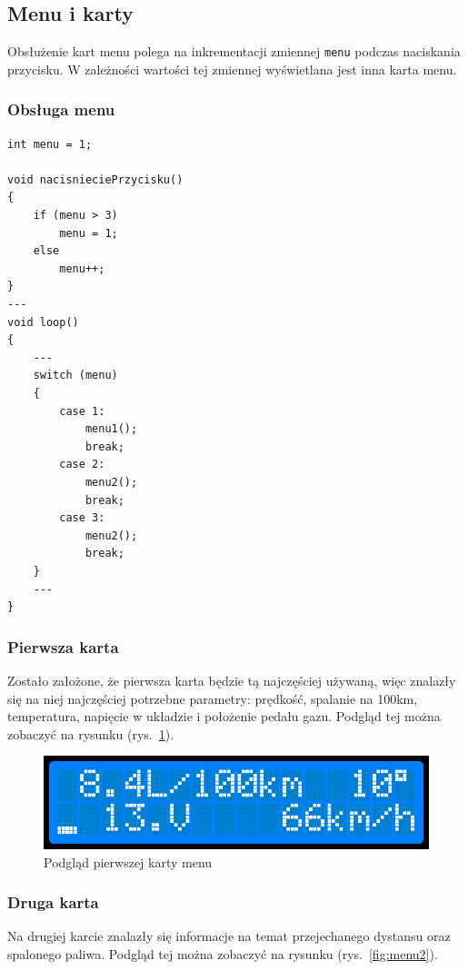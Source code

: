 \subsection{Menu i karty}
Obsłużenie kart menu polega na inkrementacji zmiennej \texttt{menu} podczas naciskania przycisku. W zależności wartości tej zmiennej wyświetlana jest inna karta menu.

\subsubsection{Obsługa menu}

\begin{lstlisting}[label=list:menu,caption=Implementacja obsługi menu,
basicstyle=\footnotesize\ttfamily]
int menu = 1;

void nacisnieciePrzycisku()
{
    if (menu > 3)
        menu = 1;
    else
        menu++;
}
---
void loop()
{
    ---
    switch (menu) 
    {
        case 1:
            menu1();
            break;
        case 2:
            menu2();
            break;
        case 3:
            menu2();
            break;
    }
    ---
}
\end{lstlisting}

\subsubsection{Pierwsza karta}

Zostało założone, że pierwsza karta będzie tą najczęściej używaną, więc znalazły się na niej najczęściej potrzebne parametry: prędkość, spalanie na 100km, temperatura, napięcie w układzie i położenie pedału gazu. Podgląd tej można zobaczyć na rysunku (rys.~\ref{fig:menu1}).

\begin{figure}[!htb]
\centering
\includegraphics[width=0.7\linewidth]{Rysunki/menu1.png}
\caption{Podgląd pierwszej karty menu}
\label{fig:menu1}
\end{figure}

\subsubsection{Druga karta}
Na drugiej karcie znalazły się informacje na temat przejechanego dystansu oraz spalonego paliwa. Podgląd tej można zobaczyć na rysunku (rys.~\ref{fig:menu2}).

